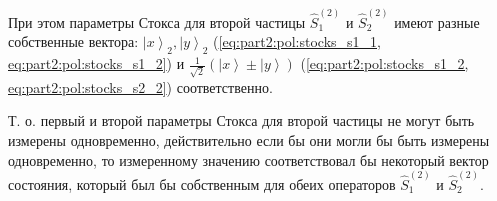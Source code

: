 При этом параметры Стокса для второй частицы  $\hat{S}_1^{(2)}$ и
$\hat{S}_2^{(2)}$ имеют 
разные собственные вектора:
$\left|x\right>_2, \left|y\right>_2$ (\ref{eq:part2:pol:stocks_s1_1,
  eq:part2:pol:stocks_s1_2}) и
$\frac{1}{\sqrt{2}}\left(\left|x\right> \pm
\left|y\right>\right)$ (\ref{eq:part2:pol:stocks_s1_2,
  eq:part2:pol:stocks_s2_2}) соответственно.

Т. о. первый и второй параметры Стокса для второй частицы не могут
быть измерены одновременно, действительно если бы они могли бы быть
измерены одновременно, то измеренному значению соответствовал бы
некоторый вектор состояния, который был бы собственным для обеих
операторов $\hat{S}_1^{(2)}$ и
$\hat{S}_2^{(2)}$.
